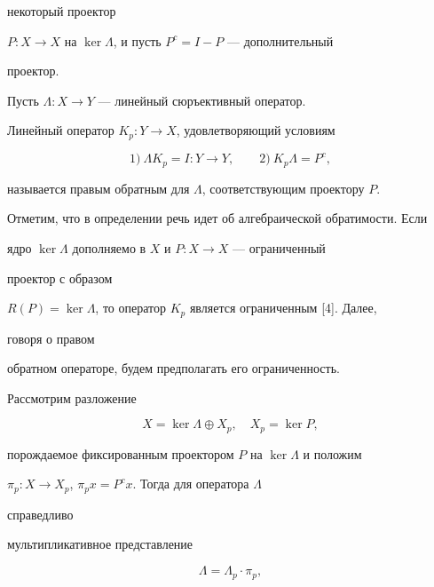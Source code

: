 некоторый проектор 


$P:X\to X$ на $\ker\Lambda$, и пусть $P^c=I-P$ --- дополнительный 


проектор. 


 


\begin{defn} 


Пусть $\Lambda:X\to Y$ --- линейный сюръективный оператор.  


Линейный оператор $K_p:Y\to X$, удовлетворяющий условиям 


$$ 


1) \ \Lambda K_p=I:Y\to Y,\qquad 2) \ K_p\Lambda=P^c, 


$$ 


называется правым обратным для $\Lambda$, соответствующим проектору $P$. 


\end{defn} 


 


Отметим, что в определении речь идет об алгебраической обратимости. Если  


ядро $\ker\Lambda$ дополняемо в $X$ и $P:X\to X$ --- ограниченный 


проектор с образом  


$R(P)=\ker\Lambda$, то оператор $K_p$ является ограниченным [4]. Далее, 


говоря о правом 


обратном операторе, будем предполагать его ограниченность.  


 


Рассмотрим разложение 


$$ 


X=\ker\Lambda\oplus X_p,\quad 


X_p=\ker P, 


$$ 


порождаемое фиксированным проектором $P$ на $\ker\Lambda$ и положим  


$\pi_p:X\to X_p$, $\pi_p x=P^c x$. Тогда для оператора $\Lambda$ 


справедливо 


мультипликативное представление 


\begin{equation} 


\Lambda=\Lambda_p\cdot\pi_p, 


\end{equation} 


